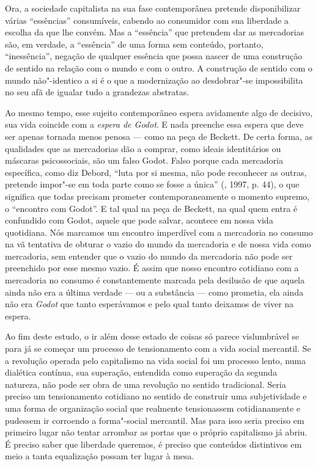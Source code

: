 Ora, a sociedade capitalista na sua fase contemporânea pretende
disponibilizar várias ``essências'' consumíveis, cabendo ao consumidor
com sua liberdade a escolha da que lhe convém. Mas a ``essência'' que
pretendem dar as mercadorias são, em verdade, a ``essência'' de uma
forma sem conteúdo, portanto, ``inessência'', negação de qualquer
essência que possa nascer de uma construção de sentido na relação com o
mundo e com o outro. A construção de sentido com o mundo não"-identico a
si é o que a modernização ao desdobrar"-se impossibilita no seu afã de
igualar tudo a grandezas abstratas.

Ao mesmo tempo, esse sujeito contemporâneo espera avidamente algo de
decisivo, sua vida coincide com a \emph{espera de Godot}. E nada
preenche essa espera que deve ser apenas tornada menos penosa --- como
na peça de Beckett. De certa forma, as qualidades que as mercadorias dão
a comprar, como ideais identitários ou máscaras psicossociais, são um
falso Godot. Falso porque cada mercadoria específica, como diz Debord,
``luta por si mesma, não pode reconhecer as outras, pretende impor"-se em
toda parte como se fosse a única'' (, 1997, p. 44), o que
significa que todas precisam prometer contemporaneamente o momento
supremo, o ``encontro com Godot''. E tal qual na peça de Beckett, na
qual quem entra é confundido com Godot, aquele que pode salvar, acontece
em nossa vida quotidiana. Nós marcamos um encontro imperdível com a
mercadoria no consumo na vã tentativa de obturar o vazio do mundo da
mercadoria e de nossa vida como mercadoria, sem entender que o vazio do
mundo da mercadoria não pode ser preenchido por esse mesmo vazio. É
assim que nosso encontro cotidiano com a mercadoria no consumo é
constantemente marcada pela desilusão de que aquela ainda não era a
última verdade --- ou a substância --- como prometia, ela ainda não era
\emph{Godot} que tanto esperávamos e pelo qual tanto deixamos de viver
na espera.

Ao fim deste estudo, o ir além desse estado de coisas só parece
vislumbrável se para já se começar um processo de tensionamento com a
vida social mercantil. Se a revolução operada pelo capitalismo na vida
social foi um processo lento, numa dialética contínua, sua superação,
entendida como superação da segunda natureza, não pode ser obra de uma
revolução no sentido tradicional. Seria preciso um tensionamento
cotidiano no sentido de construir uma subjetividade e uma forma de
organização social que realmente tensionassem cotidianamente e pudessem
ir corroendo a forma"-social mercantil. Mas para isso seria preciso em
primeiro lugar não tentar arrombar as portas que o próprio capitalismo
já abriu. É preciso saber que liberdade queremos, é preciso que
conteúdos distintivos em meio a tanta equalização possam ter lugar à
mesa.

